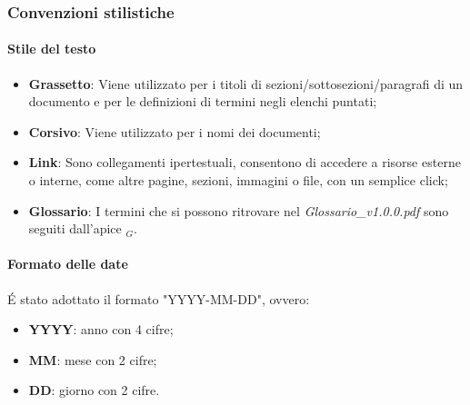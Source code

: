 \documentclass[10pt]{article}
\begin{document}
\begin{justify}
    \subsubsection{Convenzioni stilistiche}
        \paragraph{Stile del testo}
        \begin{itemize}
            \item \textbf{Grassetto}: Viene utilizzato per i titoli di sezioni/sottosezioni/paragrafi di un documento e per le definizioni di termini negli elenchi puntati;
            \item \textbf{Corsivo}: Viene utilizzato per i nomi dei documenti;
            \item \textbf{Link}: Sono collegamenti ipertestuali, consentono di accedere a risorse esterne o interne, come altre pagine, sezioni, immagini o file, con un semplice click;
            \item \textbf{Glossario}: I termini che si possono ritrovare nel \textit{Glossario\_v1.0.0.pdf} sono seguiti dall'apice $_G$.
        \end{itemize}

        \paragraph{Formato delle date}
        \'E stato adottato il formato "YYYY-MM-DD", ovvero:
        \begin{itemize}
            \item \textbf{YYYY}: anno con 4 cifre;
            \item \textbf{MM}: mese con 2 cifre;
            \item \textbf{DD}: giorno con 2 cifre.
        \end{itemize}


\end{justify}
\end{document}

